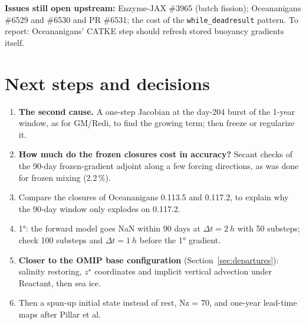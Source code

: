 \documentclass[10pt]{article}
\begin{document}
\textbf{Issues still open upstream:} Enzyme-JAX \#3965 (batch fission); Oceananigans \#6529 and \#6530 and PR \#6531;
the cost of the \texttt{while\_deadresult} pattern. To report: Oceananigans' CATKE step should refresh stored
buoyancy gradients itself.

\section{Next steps and decisions}
\label{sec:next}

\begin{enumerate}
  \item \textbf{The second cause.} A one-step Jacobian at the day-204 burst of the 1-year window, as for GM/Redi, to
        find the growing term; then freeze or regularize it.
  \item \textbf{How much do the frozen closures cost in accuracy?} Secant checks of the 90-day frozen-gradient
        adjoint along a few forcing directions, as was done for frozen mixing (2.2\,\%).
  \item Compare the closures of Oceananigans 0.113.5 and 0.117.2, to explain why the 90-day window only explodes on
        0.117.2.
  \item \ang{1}: the forward model goes NaN within 90 days at $\Delta t = \SI{2}{h}$ with 50 substeps; check 100 substeps
        and $\Delta t = \SI{1}{h}$ before the \ang{1} gradient.
  \item \textbf{Closer to the OMIP base configuration} (Section~\ref{sec:departures}): salinity restoring, $z^\star$
        coordinates and implicit vertical advection under Reactant, then sea ice.
  \item Then a spun-up initial state instead of rest, Nz = 70, and one-year lead-time maps after Pillar et al.
\end{enumerate}
\end{document}
